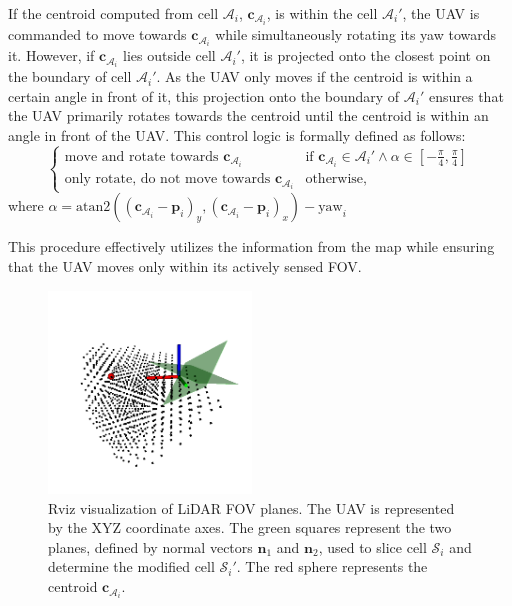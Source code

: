             If the centroid computed from cell $\mathcal{A}_i$, $\mathbf{c}_{\mathcal{A}_i}$, is within the cell $\mathcal{A}_i'$, the \ac{UAV} is commanded to move towards $\mathbf{c}_{\mathcal{A}_i}$ while simultaneously rotating its yaw towards it.
            However, if $\mathbf{c}_{\mathcal{A}_i}$ lies outside cell $\mathcal{A}_i'$, it is projected onto the closest point on the boundary of cell $\mathcal{A}_i'$.
            As the \ac{UAV} only moves if the centroid is within a certain angle in front of it, this projection onto the boundary of $\mathcal{A}_i'$ ensures that the \ac{UAV} primarily rotates towards the centroid until the centroid is within an angle in front of the \ac{UAV}.
            This control logic is formally defined as follows:
            \begin{equation}
                \begin{cases}
                    \text{move and rotate towards } \mathbf{c}_{\mathcal{A}_i} & \text{if } \mathbf{c}_{\mathcal{A}_i} \in \mathcal{A}_i' \land \alpha \in [-\frac{\pi}{4}, \frac{\pi}{4}] \\
                    \text{only rotate, do not move towards } \mathbf{c}_{\mathcal{A}_i} & \text{otherwise, }
                \end{cases}
            \end{equation}
            where $\alpha = \text{atan2}((\mathbf{c}_{\mathcal{A}_i} - \mathbf{p}_i)_y, (\mathbf{c}_{\mathcal{A}_i} - \mathbf{p}_i)_x) - \text{yaw}_i$

            This procedure effectively utilizes the information from the map while ensuring that the \ac{UAV} moves only within its actively sensed \ac{FOV}.

            \begin{figure}[H]
                \centering
                \includegraphics[width=0.48\textwidth]{./fig/rviz/cell_a_sliced_with_planes.png}
                \caption{
                    Rviz visualization of \ac{LiDAR} \ac{FOV} planes. The \ac{UAV} is represented by the XYZ coordinate axes. 
                    The green squares represent the two planes, defined by normal vectors $\mathbf{n}_1$ and $\mathbf{n}_2$, used to slice cell $\mathcal{S}_i$ and determine the modified cell $\mathcal{S}_i'$.
                    The red sphere represents the centroid $\mathbf{c}_{\mathcal{A}_i}$.
                }
                \label{fig:cell_a_sliced}
            \end{figure}
    
